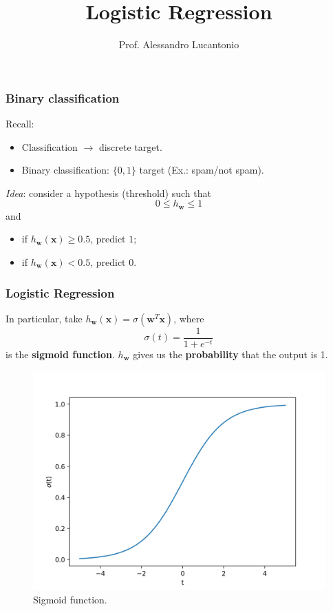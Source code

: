 \documentclass{beamer}
\title{Logistic Regression}
\author{Prof. Alessandro Lucantonio}
\institute{Aarhus University}
\date{}
\begin{document}
	\frame{\titlepage}
	
	\begin{frame}
		\frametitle{Binary classification}
		Recall: 
		\begin{itemize}
			\item Classification $\rightarrow$ discrete target.
			\item Binary classification: $\{0,1\}$ target (Ex.: spam/not spam).
		\end{itemize}
		
		\vspace{5mm}
		\textit{Idea}: consider a hypothesis (threshold) such that
		\begin{equation*}
			0 \leq h_{\bm{w}} \leq 1
		\end{equation*}
		and
		\begin{itemize}
			\item if $h_{\bm{w}}(\bm{x}) \geq 0.5$, predict $1$;
			\item if $h_{\bm{w}}(\bm{x}) < 0.5$, predict $0$.
		\end{itemize}
	\end{frame}

	\begin{frame}
		\frametitle{Logistic Regression}
		In particular, take $h_{\bm{w}}(\bm{x}) = \sigma(\bm{w}^T\bm{x})$, where
		\begin{equation*}
			\sigma(t) = \frac{1}{1+e^{-t}}
		\end{equation*}
		is the \textbf{sigmoid function}.
		$h_{\bm{w}}$ gives us the \textbf{probability} that the output is 1.
		\begin{figure}
			\centering
			\includegraphics[scale=0.42]{images/sigmoid}
			\caption{Sigmoid function.}
		\end{figure}
		
	\end{frame}
\end{document}

